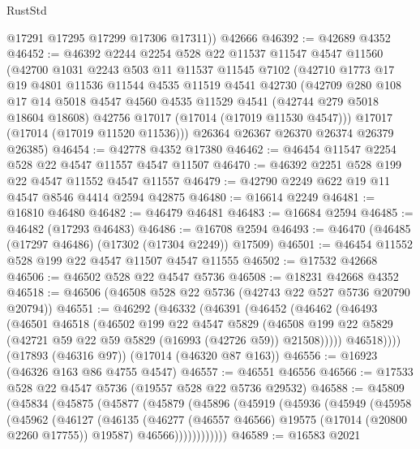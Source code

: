 \begin{lexlean}{RustStd}
\begin{coremodule}
{\begin{coremodule}
{{{{{{{{{{{{{{{{{{{{{{{{{{{{{{{{{{{{{{{{{{{{{{{{{{{{{{{        @17291
        @17295
        @17299
        @17306
        @17311))
    @42666
@46392 := @42689 @4352
@46452 := @46392
    @2244
    @2254
    @528
    @22
    @11537
    @11547
    @4547
    @11560
    (@42700
      @1031
      @2243
      @503
      @11
      @11537
      @11545
      @7102
      (@42710
        @1773
        @17
        @19
        @4801
        @11536
        @11544
        @4535
        @11519
        @4541
        @42730
        (@42709
          @280
          @108
          @17
          @14
          @5018
          @4547
          @4560
          @4535
          @11529
          @4541
          (@42744 @279 @5018 @18604 @18608)
          @42756
          @17017
          (@17014 (@17019 @11530 @4547)))
        @17017
        (@17014 (@17019 @11520 @11536)))
      @26364
      @26367
      @26370
      @26374
      @26379
      @26385)
@46454 := @42778 @4352 @17380
@46462 := @46454 @11547 @2254 @528 @22 @4547 @11557 @4547 @11507
@46470 := @46392 @2251 @528 @199 @22 @4547 @11552 @4547 @11557
@46479 := @42790 @2249 @622 @19 @11 @4547 @8546 @4414 @2594 @42875
@46480 := @16614 @2249
@46481 := @16810 @46480
@46482 := @46479 @46481
@46483 := @16684 @2594
@46485 := @46482 (@17293 @46483)
@46486 := @16708 @2594
@46493 := @46470 (@46485 (@17297 @46486) (@17302 (@17304 @2249)) @17509)
@46501 := @46454 @11552 @528 @199 @22 @4547 @11507 @4547 @11555
@46502 := @17532 @42668
@46506 := @46502 @528 @22 @4547 @5736
@46508 := @18231 @42668 @4352
@46518 := @46506 (@46508 @528 @22 @5736 (@42743 @22 @527 @5736 @20790 @20794))
@46551 := @46292
    (@46332
      (@46391
        (@46452
          (@46462
            (@46493
              (@46501
                @46518
                (@46502
                  @199
                  @22
                  @4547
                  @5829
                  (@46508 @199 @22 @5829 (@42721 @59 @22 @59 @5829 (@16993 (@42726 @59)) @21508)))))
            @46518))))
    (@17893 (@46316 @97))
    (@17014 (@46320 @87 @163))
@46556 := @16923 (@46326 @163 @86 @4755 @4547)
@46557 := @46551 @46556
@46566 := @17533 @528 @22 @4547 @5736 (@19557 @528 @22 @5736 @29532)
@46588 := @45809
    (@45834
      (@45875
        (@45877
          (@45879
            (@45896
              (@45919
                (@45936
                  (@45949
                    (@45958
                      (@45962
                        (@46127
                          (@46135
                            (@46277 (@46557 @46566) @19575 (@17014 (@20800 @2260 @17755)) @19587)
                            @46566))))))))))))
@46589 := @16583 @2021
}}}}}}}}}}}}}}}}}}}}}}}}}}}}}}}}}}}}}}}}}}}}}}}}}}}}}}}
\end{coremodule}}
\end{coremodule}
\end{lexlean}
